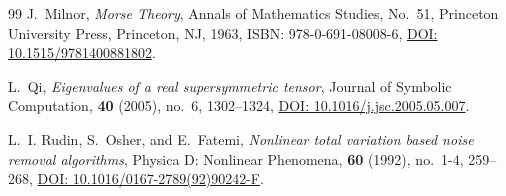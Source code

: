 \documentclass[11pt,a4paper,reqno]{amsart}
\theoremstyle{definition}
\numberwithin{equation}{section}
\begin{document}
\begin{thebibliography}{99}
J.~Milnor,
\emph{Morse Theory},
Annals of Mathematics Studies, No.~51, Princeton University Press, Princeton, NJ, 1963,
ISBN: 978-0-691-08008-6,
\href{https://doi.org/10.1515/9781400881802}{DOI: 10.1515/9781400881802}.

L.~Qi,
\emph{Eigenvalues of a real supersymmetric tensor},
Journal of Symbolic Computation, \textbf{40} (2005), no.~6, 1302--1324,
\href{https://doi.org/10.1016/j.jsc.2005.05.007}{DOI: 10.1016/j.jsc.2005.05.007}.

L.~I. Rudin, S.~Osher, and E.~Fatemi,
\emph{Nonlinear total variation based noise removal algorithms},
Physica D: Nonlinear Phenomena, \textbf{60} (1992), no.~1-4, 259--268,
\href{https://doi.org/10.1016/0167-2789(92)90242-F}{DOI: 10.1016/0167-2789(92)90242-F}.

\end{thebibliography}
\end{document}
